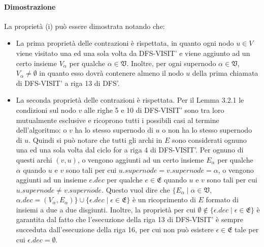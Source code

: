     \paragraph{Dimostrazione}
    La propriet\`a (i) pu\`o essere dimostrata notando che:
    \begin{itemize}
        \item La prima propriet\`a delle contrazioni \`e rispettata, in quanto ogni nodo $u \in V$ viene visitato una ed una
        sola volta da DFS-VISIT' e viene aggiunto ad un certo insieme $V_{\alpha}$ per qualche $\alpha \in \mathfrak{V}$.
        Inoltre, per ogni supernodo $\alpha \in \mathfrak{V}$, $V_{\alpha} \neq \emptyset$ in quanto esso dovr\`a contenere
        almeno il nodo $u$ della prima chiamata di DFS-VISIT' a riga 13 di DFS'.

        \item La seconda propriet\`a delle contrazioni \`e rispettata.
        Per il Lemma 3.2.1 le condizioni sul nodo $v$ alle righe 5 e 10 di DFS-VISIT' sono tra loro mutualmente
        esclusive e ricoprono tutti i possibili casi al termine dell'algoritmo: o $v$ ha lo stesso supernodo di $u$ o
        non ha lo stesso supernodo di $u$.
        Quindi si pu\`o notare che tutti gli archi in $E$ sono considerati ognuno una ed una sola volta dal ciclo for a
        riga 4 di DFS-VISIT'. Per ognuno di questi archi $(v, u)$, o vengono aggiunti ad un certo insieme $E_{\alpha}$
        per qualche $\alpha$ quando $u$ e $v$ sono tali per cui $u.supernode = v.supernode = \alpha$, o vengono aggiunti ad
        un insieme $e.dec$ per qualche $e \in \mathfrak{E}$ quando $u$ e $v$ sono tali per cui
        $u.supernode \neq v.supernode$.
        Questo vuol dire che
        $\{ E_\alpha \mid \alpha \in \mathfrak{V}$, $\alpha.dec = (V_\alpha, E_\alpha)\} \cup \{ \epsilon .dec \mid \epsilon \in \mathfrak{E}\}$
        \`e un ricoprimento di $E$ formato di insiemi a due a due disgiunti. \newline
        Inoltre, la propriet\`a per cui $\emptyset \notin \{\epsilon .dec \mid \epsilon \in \mathfrak{E}\}$ \`e garantita dal fatto che
        l'esecuzione della riga 13 di DFS-VISIT' \`e sempre succeduta dall'esecuzione della riga 16, per cui non pu\`o
        esistere $\epsilon \in \mathfrak{E}$ tale per cui $\epsilon .dec = \emptyset$.
    \end{itemize}

